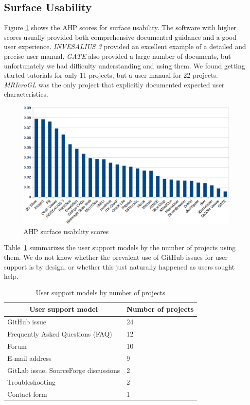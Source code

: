 \documentclass[final, 3p, times, authoryear]{elsarticle}
\begin{document}
\subsection{Surface Usability} \label{sec_result_usability}

Figure \ref{fg_usability_scores} shows the AHP scores for surface usability. The
software with higher scores usually provided both comprehensive documented
guidance and a good user experience. \textit{INVESALIUS 3} provided an excellent
example of a detailed and precise user manual. \textit{GATE} also provided a
large number of documents, but unfortunately we had difficulty understanding and
using them. We found getting started tutorials for only 11 projects, but a user
manual for 22 projects. \textit{MRIcroGL} was the only project that explicitly
documented expected user characteristics.

\begin{figure}[ht]
\includegraphics[scale=0.38]{figures/usability_scores.png}
\caption{AHP surface usability scores}
\label{fg_usability_scores}
\end{figure}
 
Table~\ref{tab_user_support_model} summarizes the user support models by the number
of projects using them. We do not know whether the prevalent use of GitHub issues for user support is by design, or whether this just naturally happened as users sought help.

\begin{table}[ht]
\centering
\begin{tabular}{ll}
\hline
\multicolumn{1}{c}{User support model} & Number of projects \\ \hline
GitHub issue & 24 \\
Frequently Asked Questions (FAQ) & 12 \\
Forum & 10 \\
E-mail address & 9 \\
GitLab issue, SourceForge discussions & 2 \\
Troubleshooting & 2 \\
Contact form & 1 \\ \hline
\end{tabular}
\caption{\label{tab_user_support_model}User support models by number of projects}
\end{table}
\end{document}
